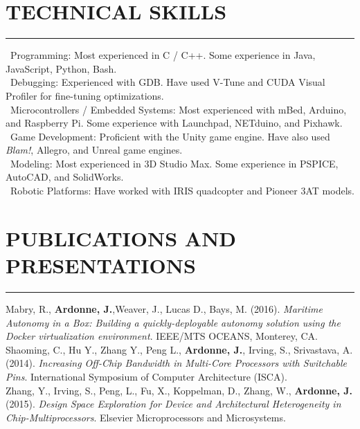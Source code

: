 \documentclass{res}
\begin{document}
\begin{resume}
\section{TECHNICAL SKILLS}
	\vspace{0.005in}	
	\rule{\textwidth}{0.5pt}	
		\textbullet \ Programming: Most experienced in C / C++. Some experience in Java, JavaScript, Python, Bash.\\
		\textbullet \ Debugging: Experienced with GDB. Have used V-Tune and CUDA Visual Profiler for fine-tuning optimizations.\\
		\textbullet \ Microcontrollers / Embedded Systems: Most experienced with mBed, Arduino, and Raspberry Pi. Some experience with Launchpad, NETduino, and Pixhawk.\\
		\textbullet \ Game Development: Proficient with the Unity game engine. Have also used \textit{Blam!}, Allegro, and Unreal game engines.\\
		\textbullet \ Modeling: Most experienced in 3D Studio Max. Some experience in PSPICE, AutoCAD, and SolidWorks.\\
		\textbullet \ Robotic Platforms: Have worked with IRIS quadcopter and Pioneer 3AT models.

\section{PUBLICATIONS AND PRESENTATIONS}
	\vspace{0.005in}	
	\rule{\textwidth}{0.5pt}
	Mabry, R., \textbf{Ardonne, J.},Weaver, J., Lucas D., Bays, M. (2016). \textit{Maritime Autonomy in a Box: Building a quickly-deployable autonomy solution using the Docker virtualization environment}. IEEE/MTS OCEANS, Monterey, CA.\\

	\vspace{-0.25in}
	Shaoming, C., Hu Y., Zhang Y., Peng L., \textbf{Ardonne, J.}, Irving, S., Srivastava, A. (2014). \textit{Increasing Off-Chip Bandwidth in Multi-Core Processors with Switchable Pins}. International Symposium of Computer Architecture (ISCA).\\
	
	\vspace{-0.25in}
	Zhang, Y., Irving, S., Peng, L., Fu, X., Koppelman, D., Zhang, W., \textbf{Ardonne, J.} (2015).  \textit{Design Space Exploration for Device and Architectural Heterogeneity in Chip-Multiprocessors}.  Elsevier Microprocessors and Microsystems. \\
	

\end{resume}
\end{document}
